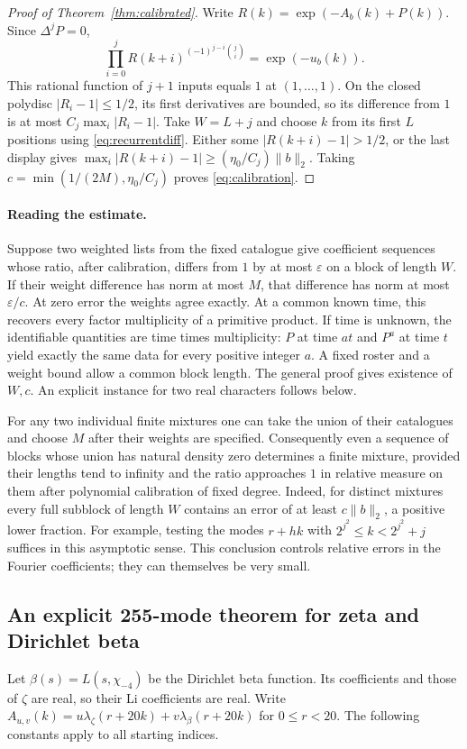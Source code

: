 \begin{proof}[Proof of Theorem~\ref{thm:calibrated}]
Write $R(k)=\exp(-A_b(k)+P(k))$. Since $\Delta^jP=0$,
\[
     \prod_{i=0}^{j} R(k+i)^{(-1)^{j-i}\binom{j}{i}}
       =\exp(-u_b(k)).
\]
This rational function of $j+1$ inputs equals $1$ at $(1,\ldots,1)$.
On the closed polydisc $|R_i-1|\le1/2$, its first derivatives are bounded,
so its difference from $1$ is at most $C_j\max_i|R_i-1|$.
Take $W=L+j$ and choose $k$ from its first $L$ positions using
\eqref{eq:recurrentdiff}. Either some $|R(k+i)-1|>1/2$, or the
last display gives $\max_i|R(k+i)-1|\ge (\eta_0/C_j)\|b\|_2$.
Taking $c=\min(1/(2M),\eta_0/C_j)$ proves \eqref{eq:calibration}.
\end{proof}

\paragraph{Reading the estimate.}
Suppose two weighted lists from the fixed catalogue give coefficient
sequences whose ratio, after calibration, differs from $1$ by at most
$\varepsilon$ on a block of length $W$. If their weight difference has
norm at most $M$, that difference has norm at most $\varepsilon/c$.
At zero error the weights agree exactly. At a common known time, this
recovers every factor multiplicity of a primitive product. If time is
unknown, the identifiable quantities are time times multiplicity:
$P$ at time $at$ and $P^a$ at time $t$ yield exactly the same data for every
positive integer $a$. A fixed roster and a weight bound allow a common
block length. The general proof gives existence of $W,c$. An explicit instance for two
real characters follows below.

For any two individual finite mixtures one can take the union of their
catalogues and choose $M$ after their weights are specified.
Consequently even a sequence of blocks whose union has natural density
zero determines a finite mixture, provided their lengths tend to infinity
and the ratio approaches $1$ in relative measure on them after
polynomial calibration of fixed degree. Indeed, for distinct mixtures
every full subblock of length $W$ contains an error of at least
$c\|b\|_2$, a positive lower fraction. For example, testing the modes
$r+hk$ with $2^{j^2}\le k<2^{j^2}+j$ suffices in this asymptotic sense.
This conclusion controls relative errors in the Fourier coefficients;
they can themselves be very small.

\subsection{An explicit 255-mode theorem for zeta and Dirichlet beta}
Let $\beta(s)=L(s,\chi_{-4})$ be the Dirichlet beta function. Its coefficients
and those of $\zeta$ are real, so their Li coefficients are real.
Write $A_{u,v}(k)=u\lambda_\zeta(r+20k)+v\lambda_\beta(r+20k)$ for
$0\le r<20$. The following constants apply to all starting indices.

